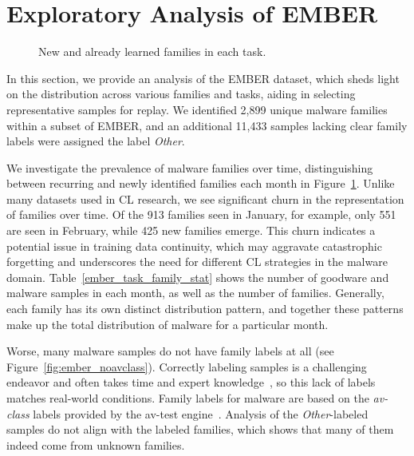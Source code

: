 \section{Exploratory Analysis of EMBER}
\label{sec:exploratoryAnalysis}

\begin{figure}[!t]
\tiny
\begin{minipage}[c]{\linewidth}
\centering

\vskip -0.1cm
\caption{New and already learned families in each task.}
\label{fig:ember_frequency_families}
\end{minipage}%
\vspace{-0.3cm}
\end{figure}




In this section, we provide an analysis of the EMBER dataset, which sheds light on the distribution across various families and tasks, aiding in selecting representative samples for replay. We identified 2,899 unique malware families within a subset of EMBER, and an additional 11,433 samples lacking clear family labels were assigned the label {\em Other}.

We investigate the prevalence of malware families over time, distinguishing between recurring and newly identified families each month in Figure~\ref{fig:ember_frequency_families}. Unlike many datasets used in CL research, we see significant churn in the representation of families over time. Of the 913 families seen in January, for example, only 551 are seen in February, while 425 new families emerge. This churn indicates a potential issue in training data continuity, which may aggravate catastrophic forgetting and underscores the need for different CL strategies in the malware domain. Table~\ref{ember_task_family_stat} shows the number of goodware and malware samples in each month, as well as the number of families. Generally, each family has its own distinct distribution pattern, and together these patterns make up the total distribution of malware for a particular month. 

Worse, many malware samples do not have family labels at all (see Figure~\ref{fig:ember_noavclass}). Correctly labeling samples is a challenging endeavor and often takes time and expert knowledge~\cite{kantchelian2015better}, so this lack of labels matches real-world conditions. Family labels for malware are based on the {\em av-class} labels provided by the av-test engine~\cite{av-test}. Analysis of the \emph{Other}-labeled samples do not align with the labeled families, which shows that many of them indeed come from unknown families. 

